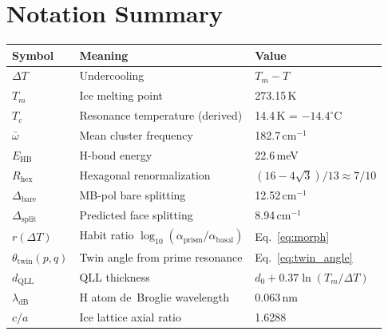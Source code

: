 \documentclass[11pt,a4paper]{article}
\begin{document}
\section{Notation Summary}

\begin{center}\small
\begin{tabular}{lll}
\toprule
Symbol & Meaning & Value \\
\midrule
$\Delta T$ & Undercooling & $T_m - T$ \\
$T_m$ & Ice melting point & 273.15\,K \\
$T_c$ & Resonance temperature (derived) & 14.4\,K = $-14.4^\circ$C \\
$\bar\omega$ & Mean cluster frequency & 182.7\,cm$^{-1}$ \\
$E_\text{HB}$ & H-bond energy & 22.6\,meV \\
$R_\text{hex}$ & Hexagonal renormalization & $(16-4\sqrt{3})/13 \approx 7/10$ \\
$\Delta_\text{bare}$ & MB-pol bare splitting & 12.52\,cm$^{-1}$ \\
$\Delta_\text{split}$ & Predicted face splitting & 8.94\,cm$^{-1}$ \\
$r(\Delta T)$ & Habit ratio $\log_{10}(\alpha_\text{prism}/\alpha_\text{basal})$ & Eq.~\ref{eq:morph} \\
$\theta_\text{twin}(p,q)$ & Twin angle from prime resonance & Eq.~\ref{eq:twin_angle} \\
$d_\text{QLL}$ & QLL thickness & $d_0 + 0.37\ln(T_m/\Delta T)$ \\
$\lambda_\text{dB}$ & H atom de~Broglie wavelength & 0.063\,nm \\
$c/a$ & Ice lattice axial ratio & 1.6288 \\
\bottomrule
\end{tabular}
\end{center}
\end{document}
